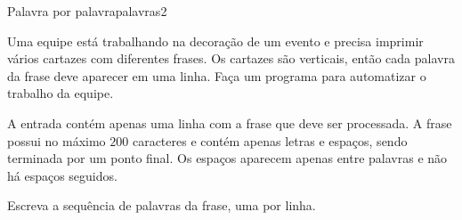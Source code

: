 \documentclass[12pt,a4paper,oneside]{article}
\begin{document}
\begin{problem}{Palavra por palavra}{palavras}{2}

\begingroup
\setlength{\intextsep}{0pt}%

Uma equipe está trabalhando na decoração de um evento e precisa imprimir vários cartazes com diferentes frases.
Os cartazes são verticais, então cada palavra da frase deve aparecer em uma linha.
Faça um programa para automatizar o trabalho da equipe.


\InputFile

A entrada contém apenas uma linha com a frase que deve ser processada. A frase possui no máximo $200$ caracteres e contém apenas letras e espaços, sendo terminada por um ponto final. Os espaços aparecem apenas entre palavras e não há espaços seguidos.

\endgroup

\OutputFile

Escreva a sequência de palavras da frase, uma por linha.


\Example

\begin{example}
%
\end{example}

\begin{example}
%
\end{example}

\begin{example}
%
\end{example}


\end{problem}
\end{document}
